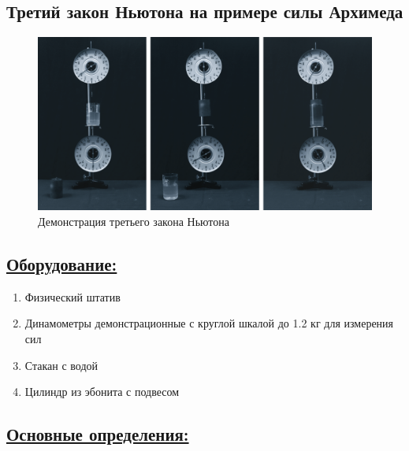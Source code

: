 \documentclass[14pt,a4paper,oneside]{extarticle}	%
\begin{document}

\newpage
\begin{center}
	\subsection*{Третий закон Ньютона на примере силы Архимеда}
\end{center}

\begin{figure}[H]
	\centering 		
	\includegraphics[width=1\linewidth]{newton-3.png} 
	\caption{Демонстрация третьего закона Ньютона}
	\label{newton-3}
\end{figure}

\subsection*{\underline{Оборудование:}}

\begin{enumerate}
	\item Физический штатив
	\item Динамометры демонстрационные с круглой шкалой до 1.2 кг для измерения сил
	\item Стакан с водой
	\item Цилиндр из эбонита с подвесом
\end{enumerate}

\newpage
\subsection*{\underline{Основные определения:}}
\end{document}
